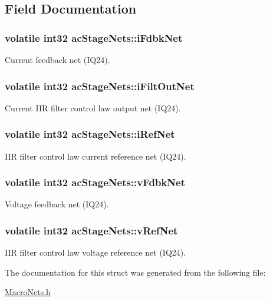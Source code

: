 \subsection{Field Documentation}
\hypertarget{a00003_a4e528cf0beafdcc7ab51f05980c719b3}{
\subsubsection[{i\-Fdbk\-Net}]{\setlength{\rightskip}{0pt plus 5cm}volatile int32 ac\-Stage\-Nets\-::i\-Fdbk\-Net}}\label{a00003_a4e528cf0beafdcc7ab51f05980c719b3}
Current feedback net (I\-Q24). \hypertarget{a00003_a4d5d9d0263738ce9262cdbd4db0e404b}{
\subsubsection[{i\-Filt\-Out\-Net}]{\setlength{\rightskip}{0pt plus 5cm}volatile int32 ac\-Stage\-Nets\-::i\-Filt\-Out\-Net}}\label{a00003_a4d5d9d0263738ce9262cdbd4db0e404b}
Current I\-I\-R filter control law output net (I\-Q24). \hypertarget{a00003_aef9fb780c943a15cfcf991e330f13d26}{
\subsubsection[{i\-Ref\-Net}]{\setlength{\rightskip}{0pt plus 5cm}volatile int32 ac\-Stage\-Nets\-::i\-Ref\-Net}}\label{a00003_aef9fb780c943a15cfcf991e330f13d26}
I\-I\-R filter control law current reference net (I\-Q24). \hypertarget{a00003_a2fa47f230edc315908ef3c7594572d40}{
\subsubsection[{v\-Fdbk\-Net}]{\setlength{\rightskip}{0pt plus 5cm}volatile int32 ac\-Stage\-Nets\-::v\-Fdbk\-Net}}\label{a00003_a2fa47f230edc315908ef3c7594572d40}
Voltage feedback net (I\-Q24). \hypertarget{a00003_a60c47bf62f481657a9548acf5115bdcc}{
\subsubsection[{v\-Ref\-Net}]{\setlength{\rightskip}{0pt plus 5cm}volatile int32 ac\-Stage\-Nets\-::v\-Ref\-Net}}\label{a00003_a60c47bf62f481657a9548acf5115bdcc}
I\-I\-R filter control law voltage reference net (I\-Q24). 

The documentation for this struct was generated from the following file\-:\begin{DoxyCompactItemize}
\item 
\hyperlink{a00027}{Macro\-Nets.\-h}\end{DoxyCompactItemize}
